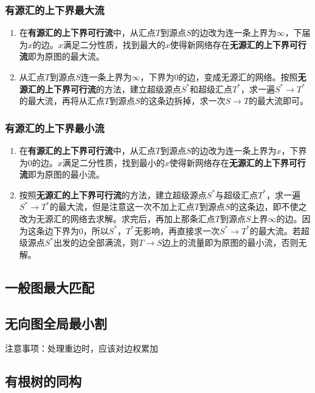 \documentclass[landscape,a4paper]{article}
\begin{document}
\begin{spacing}{0.3}
\begin{multicols}{3}
\subsubsection{有源汇的上下界最大流}
\begin{enumerate}
	\item 在\textbf{有源汇的上下界可行流}中，从汇点$T$到源点$S$的边改为连一条上界为$\infty$，下届为$x$的边。$x$满足二分性质，找到最大的$x$使得新网络存在\textbf{无源汇的上下界可行流}即为原图的最大流。
	\item 从汇点$T$到源点$S$连一条上界为$\infty$，下界为$0$的边，变成无源汇的网络。按照\textbf{无源汇的上下界可行流}的方法，建立超级源点$S^*$和超级汇点$T^*$，求一遍$S^* \rightarrow T^*$的最大流，再将从汇点$T$到源点$S$的这条边拆掉，求一次$S \rightarrow T$的最大流即可。
\end{enumerate}
\subsubsection{有源汇的上下界最小流}
\begin{enumerate}
	\item 在\textbf{有源汇的上下界可行流}中，从汇点$T$到源点$S$的边改为连一条上界为$x$，下界为$0$的边。$x$满足二分性质，找到最小的$x$使得新网络存在\textbf{无源汇的上下界可行流}即为原图的最小流。
	\item 按照\textbf{无源汇的上下界可行流}的方法，建立超级源点$S^*$与超级汇点$T^*$，求一遍$S^* \rightarrow T^*$的最大流，但是注意这一次不加上汇点$T$到源点$S$的这条边，即不使之改为无源汇的网络去求解。求完后，再加上那条汇点$T$到源点$S$上界$\infty$的边。因为这条边下界为$0$，所以$S^*$，$T^*$无影响，再直接求一次$S^* \rightarrow T^*$的最大流。若超级源点$S^*$出发的边全部满流，则$T \rightarrow S$边上的流量即为原图的最小流，否则无解。
\end{enumerate}
	\subsection{一般图最大匹配}
	
	\subsection{无向图全局最小割}
	注意事项：处理重边时，应该对边权累加
	
	\subsection{有根树的同构}
	

\end{multicols}
\end{spacing}
\end{document}

